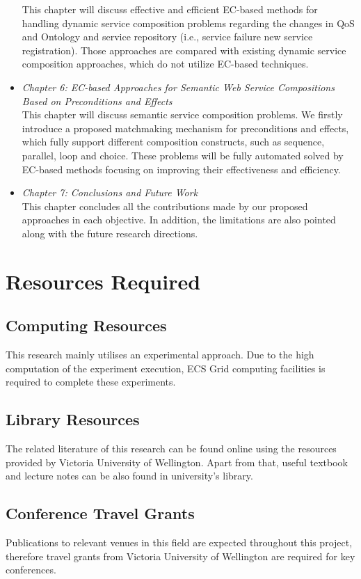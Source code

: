 \begin{itemize}
This chapter will discuss effective and efficient EC-based methods for handling dynamic service composition problems regarding the changes in QoS and Ontology and service repository (i.e., service failure new service registration). Those approaches are compared with existing dynamic service composition approaches, which do not utilize EC-based techniques.
 \item \textit{Chapter 6: EC-based Approaches for Semantic Web Service Compositions Based on Preconditions and Effects}\\
This chapter will discuss semantic service composition problems. We firstly introduce a proposed matchmaking mechanism for preconditions and effects, which fully support different composition constructs, such as sequence, parallel, loop and choice. These problems will be fully automated solved by EC-based methods focusing on improving their effectiveness and efficiency.
 \item \textit{Chapter 7: Conclusions and Future Work}\\
This chapter concludes all the contributions made by our proposed approaches in each objective. In addition, the limitations are also pointed along with the future research directions.
\end{itemize}


\section{Resources Required}

\subsection{Computing Resources}
This research mainly utilises an experimental approach. Due to the high computation of the experiment execution, ECS Grid computing facilities is required to complete these experiments.

\subsection{Library Resources}
The related literature of this research can be found online using the resources provided by Victoria University of Wellington. Apart from that, useful textbook and lecture notes can be also found in university's library.

\subsection{Conference Travel Grants}
Publications to relevant venues in this field are expected throughout this project, therefore travel grants from Victoria University of Wellington are required for key conferences.